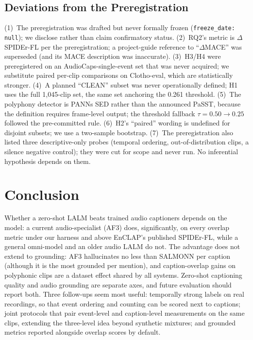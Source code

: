 \documentclass[conference]{IEEEtran}
\begin{document}
\subsection{Deviations from the Preregistration}\label{sec:deviations}
(1)~The preregistration was drafted but never formally frozen
(\texttt{freeze\_date: null}); we disclose rather than claim confirmatory
status. (2)~RQ2's metric is $\Delta$SPIDEr-FL per the preregistration; a
project-guide reference to ``$\Delta$MACE'' was superseded (and its MACE
description was inaccurate). (3)~H3/H4 were preregistered on an
AudioCaps-single-event set that was never acquired; we substitute paired
per-clip comparisons on Clotho-eval, which are statistically stronger.
(4)~A planned ``CLEAN'' subset was never operationally defined; H1 uses the
full 1{,}045-clip set, the same set anchoring the 0.261 threshold.
(5)~The polyphony detector is PANNs SED rather than the announced PaSST,
because the definition requires frame-level output; the threshold fallback
$\tau{=}0.50\rightarrow0.25$ followed the pre-committed rule. (6)~H2's
``paired'' wording is undefined for disjoint subsets; we use a two-sample
bootstrap. (7)~The preregistration also listed three descriptive-only probes
(temporal ordering, out-of-distribution clips, a silence negative control);
they were cut for scope and never run. No inferential hypothesis depends on
them.

\section{Conclusion}\label{sec:conclusion}
Whether a zero-shot LALM beats trained audio captioners depends on the model:
a current audio-specialist (AF3) does, significantly, on every overlap
metric under our harness and above EnCLAP's published SPIDEr-FL, while a general
omni-model and an older audio LALM do not. The
advantage does not extend to grounding: AF3 hallucinates no less than SALMONN
per caption (although it is the most grounded per mention), and
caption-overlap gains on polyphonic clips are a dataset effect shared by
all systems. Zero-shot captioning quality and audio grounding are separate
axes, and future evaluation should report both. Three follow-ups seem most
useful: temporally strong labels on real recordings, so that event ordering
and counting can be scored next to captions; joint protocols that pair
event-level and caption-level measurements on the same clips, extending the
three-level idea beyond synthetic mixtures; and grounded metrics reported
alongside overlap scores by default.
\end{document}
